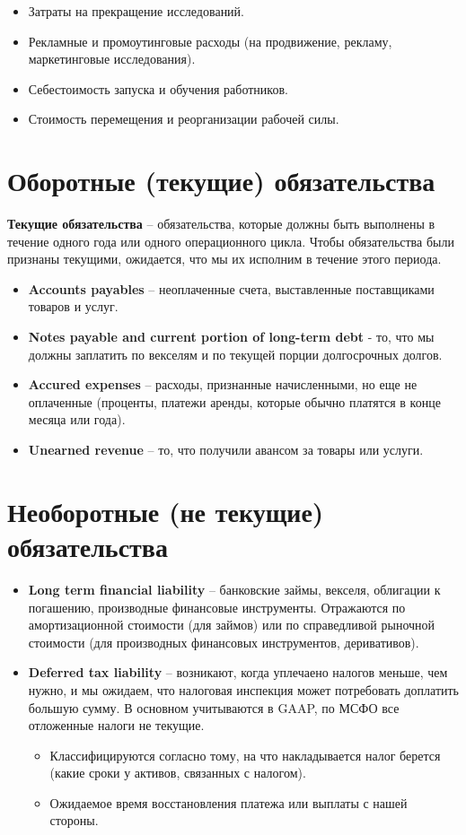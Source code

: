 \documentclass{article}
\begin{document}
\begin{itemize}
\begin{itemize}
\item Затраты на прекращение исследований.
\item Рекламные и промоутинговые расходы (на продвижение, рекламу, маркетинговые исследования).
\item Себестоимость запуска и обучения работников.
\item Стоимость перемещения и реорганизации рабочей силы.
\end{itemize}
\end{itemize}

\section{Оборотные (текущие) обязательства}
\textbf{Текущие обязательства} – обязательства, которые должны быть выполнены в течение одного года или одного операционного цикла. Чтобы обязательства были признаны текущими, ожидается, что мы их исполним в течение этого периода.  

\begin{itemize}
\item \textbf{Accounts payables} – неоплаченные счета, выставленные поставщиками товаров и услуг.
\item \textbf{Notes payable and current portion of long-term debt} - то, что мы должны заплатить по векселям и по текущей порции долгосрочных долгов. 
\item \textbf{Accured expenses} – расходы, признанные начисленными, но еще не оплаченные (проценты, платежи аренды, которые обычно платятся в конце месяца или года).
\item \textbf{Unearned revenue} – то, что получили авансом за товары или услуги.
\end{itemize}



\section{Необоротные (не текущие) обязательства}
\begin{itemize}
\item \textbf{Long term financial liability} – банковские займы, векселя, облигации к погашению, производные финансовые инструменты. Отражаются по амортизационной стоимости (для займов) или по справедливой рыночной стоимости (для производных финансовых инструментов, деривативов).
\item \textbf{Deferred tax liability} – возникают, когда уплечаено налогов меньше, чем нужно, и мы ожидаем, что налоговая инспекция может потребовать доплатить большую сумму. В основном учитываются в GAAP, по МСФО все отложенные налоги не текущие.
\begin{itemize}
\item Классифицируются согласно тому, на что накладывается налог берется (какие сроки у активов, связанных с налогом).
\item Ожидаемое время восстановления платежа или выплаты с нашей стороны.
\end{itemize}

\end{itemize}
\end{document}
